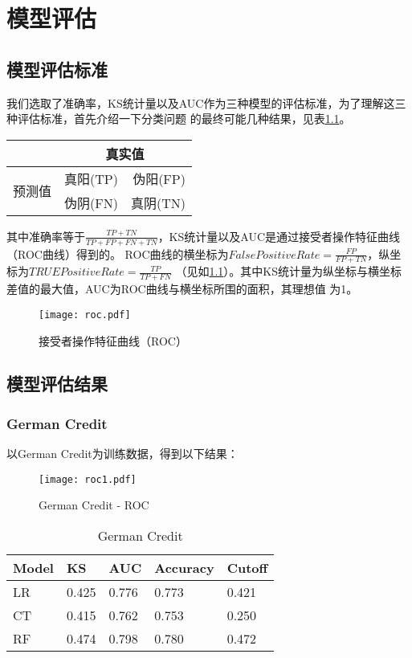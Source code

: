 \chapter{模型评估}

\section{模型评估标准}
我们选取了准确率，KS统计量以及AUC作为三种模型的评估标准，为了理解这三种评估标准，首先介绍一下分类问题
的最终可能几种结果，见表\ref{tab:roc}。

\begin{table}[htbp]
  \centering
    \begin{tabular}{rrr}
    \toprule
          & \multicolumn{2}{c}{真实值} \\
    \midrule
    \multicolumn{1}{c}{\multirow{2}[0]{*}{预测值}} & 真阳(TP) & 伪阳(FP) \\
    \multicolumn{1}{c}{} & 伪阴(FN) & 真阴(TN) \\
    \bottomrule
    \end{tabular}%
  \label{tab:roc}%
\end{table}%

其中准确率等于$\frac{TP+TN}{TP+FP+FN+TN}$，KS统计量以及AUC是通过接受者操作特征曲线（ROC曲线）得到的。
ROC曲线的横坐标为$False Positive Rate = \frac{FP}{FP+TN}$，纵坐标为$TRUE Positive Rate = \frac{TP}{TP+FN}$
（见如\ref{fig:roc}）。其中KS统计量为纵坐标与横坐标差值的最大值，AUC为ROC曲线与横坐标所围的面积，其理想值
为1。

\begin{figure}
\centering
\texttt{[image: roc.pdf]}
\caption{\label{fig:roc}接受者操作特征曲线（ROC）}
\end{figure}

\section{模型评估结果}
\subsection{German Credit}
以German Credit为训练数据，得到以下结果：

\begin{figure}
\centering
\texttt{[image: roc1.pdf]}
\caption{\label{fig:roc1}German Credit - ROC}
\end{figure}

\begin{table}[htbp]
  \centering
  \caption{German Credit}
    \begin{tabular}{lllll}
    \toprule
    Model & KS  & AUC & Accuracy  & Cutoff \\
    \midrule
    LR & 0.425 & 0.776 & 0.773 & 0.421 \\
    CT & 0.415 & 0.762 & 0.753 & 0.250 \\
    RF & 0.474 & 0.798 & 0.780  & 0.472 \\
    \bottomrule
    \end{tabular}%
  \label{tab:roc1}%
\end{table}%

